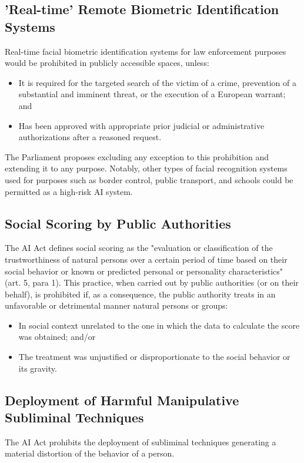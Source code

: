 \subsection{'Real-time' Remote Biometric Identification Systems}
Real-time facial biometric identification systems for law enforcement purposes would be prohibited in publicly accessible spaces, unless:
\begin{itemize}
    \item It is required for the targeted search of the victim of a crime, prevention of a substantial and imminent threat, or the execution of a European warrant; and
    \item Has been approved with appropriate prior judicial or administrative authorizations after a reasoned request.
\end{itemize}
The Parliament proposes excluding any exception to this prohibition and extending it to any purpose. Notably, other types of facial recognition systems used for purposes such as border control, public transport, and schools could be permitted as a high-risk AI system.

\subsection{Social Scoring by Public Authorities} \label{sec:social-scoring}
The AI Act defines social scoring as the "evaluation or classification of the trustworthiness of natural persons over a certain period of time based on their social behavior or known or predicted personal or personality characteristics" (art. 5, para 1). This practice, when carried out by public authorities (or on their behalf), is prohibited if, as a consequence, the public authority treats in an unfavorable or detrimental manner natural persons or groups:
\begin{itemize}
    \item In social context unrelated to the one in which the data to calculate the score was obtained; and/or
    \item The treatment was unjustified or disproportionate to the social behavior or its gravity.
\end{itemize}

\subsection{Deployment of Harmful Manipulative Subliminal Techniques}
The AI Act prohibits the deployment of subliminal techniques generating a material distortion of the behavior of a person.

